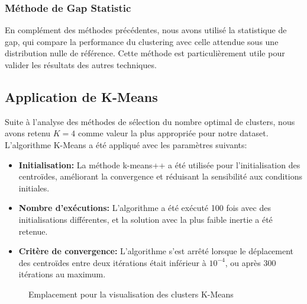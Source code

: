 \documentclass[12pt]{article}
\begin{document}
\subsubsection{Méthode de Gap Statistic}
En complément des méthodes précédentes, nous avons utilisé la statistique de gap, qui compare la performance du clustering avec celle attendue sous une distribution nulle de référence. Cette méthode est particulièrement utile pour valider les résultats des autres techniques.

\subsection{Application de K-Means}
Suite à l'analyse des méthodes de sélection du nombre optimal de clusters, nous avons retenu $K=4$ comme valeur la plus appropriée pour notre dataset. L'algorithme K-Means a été appliqué avec les paramètres suivants:

\begin{itemize}
    \item \textbf{Initialisation:} La méthode k-means++ a été utilisée pour l'initialisation des centroïdes, améliorant la convergence et réduisant la sensibilité aux conditions initiales.
    
    \item \textbf{Nombre d'exécutions:} L'algorithme a été exécuté 100 fois avec des initialisations différentes, et la solution avec la plus faible inertie a été retenue.
    
    \item \textbf{Critère de convergence:} L'algorithme s'est arrêté lorsque le déplacement des centroïdes entre deux itérations était inférieur à $10^{-4}$, ou après 300 itérations au maximum.
\end{itemize}

\begin{figure}[H]
    \centering
    \caption{Emplacement pour la visualisation des clusters K-Means}
    \label{fig:kmeans}
\end{figure}
\end{document}

